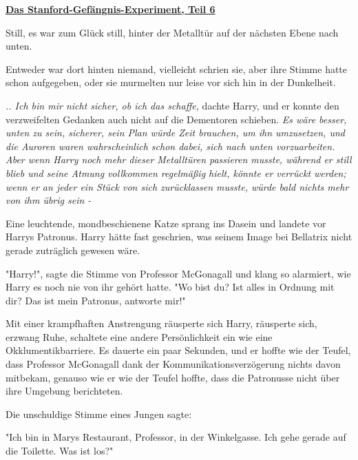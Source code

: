 

\hypertarget{das-stanford-gefuxe4ngnis-experiment-teil-6}{%

\textbf{\uline{Das Stanford-Gefängnis-Experiment, Teil 6}}

Still, es war zum Glück still, hinter der Metalltür auf der nächsten Ebene nach unten.

Entweder war dort hinten niemand, vielleicht schrien sie, aber ihre Stimme hatte schon aufgegeben, oder sie murmelten nur leise vor sich hin in der Dunkelheit.

\emph{.. Ich bin mir nicht sicher, ob ich das schaffe,} dachte Harry, und er konnte den verzweifelten Gedanken auch nicht auf die Dementoren schieben. \emph{Es wäre besser, unten zu sein, sicherer, sein Plan würde Zeit brauchen, um ihn umzusetzen, und die Auroren waren wahrscheinlich schon dabei, sich nach unten vorzuarbeiten. Aber wenn Harry noch mehr dieser Metalltüren passieren musste, während er still blieb und seine Atmung vollkommen regelmäßig hielt, könnte er verrückt werden; wenn er an jeder ein Stück von sich zurücklassen musste, würde bald nichts mehr von ihm übrig sein -}

Eine leuchtende, mondbeschienene Katze sprang ins Dasein und landete vor Harrys Patronus. Harry hätte fast geschrien, was seinem Image bei Bellatrix nicht gerade zuträglich gewesen wäre.

"Harry!", sagte die Stimme von Professor McGonagall und klang so alarmiert, wie Harry es noch nie von ihr gehört hatte. "Wo bist du? Ist alles in Ordnung mit dir? Das ist mein Patronus, antworte mir!"

Mit einer krampfhaften Anstrengung räusperte sich Harry, räusperte sich, erzwang Ruhe, schaltete eine andere Persönlichkeit ein wie eine Okklumentikbarriere. Es dauerte ein paar Sekunden, und er hoffte wie der Teufel, dass Professor McGonagall dank der Kommunikationsverzögerung nichts davon mitbekam, genauso wie er wie der Teufel hoffte, dass die Patronusse nicht über ihre Umgebung berichteten.

Die unschuldige Stimme eines Jungen sagte:

"Ich bin in Marys Restaurant, Professor, in der Winkelgasse. Ich gehe gerade auf die Toilette. Was ist los?"

}
